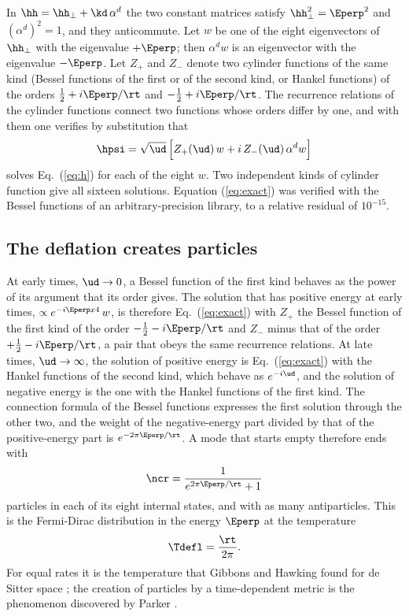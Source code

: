 In $\hh=\hh_\perp+\kd\,\alpha^{d}$ the two constant matrices satisfy $\hh_\perp^{2}=\Eperp^{2}$ and
$(\alpha^{d})^{2}=1$, and they anticommute. Let $w$ be one of the eight eigenvectors of $\hh_\perp$
with the eigenvalue $+\Eperp$; then $\alpha^{d}w$ is an eigenvector with the eigenvalue $-\Eperp$.
Let $Z_+$ and $Z_-$ denote two cylinder functions of the same kind (Bessel functions of the first or
of the second kind, or Hankel functions) of the orders $\tfrac12+i\Eperp/\rt$ and
$-\tfrac12+i\Eperp/\rt$. The recurrence relations of the cylinder functions connect two functions
whose orders differ by one, and with them one verifies by substitution that
\begin{equation}
\hpsi=\sqrt{\ud}\,\Big[Z_+(\ud)\,w+i\,Z_-(\ud)\,\alpha^{d}w\Big]
\label{eq:exact}
\end{equation}
solves Eq.~(\ref{eq:h}) for each of the eight $w$. Two independent kinds of cylinder function give
all sixteen solutions. Equation (\ref{eq:exact}) was verified with the Bessel functions of an
arbitrary-precision library, to a relative residual of $10^{-15}$.

\subsection{The deflation creates particles}

At early times, $\ud\to0$, a Bessel function of the first kind behaves as the power of its argument
that its order gives. The solution that has positive energy at early times,
$\propto e^{-i\Eperp x4}\,w$, is therefore Eq.~(\ref{eq:exact}) with $Z_+$ the Bessel function of the
first kind of the order $-\tfrac12-i\Eperp/\rt$ and $Z_-$ minus that of the order
$+\tfrac12-i\Eperp/\rt$, a pair that obeys the same recurrence relations. At late times, $\ud\to\infty$, the solution of
positive energy is Eq.~(\ref{eq:exact}) with the Hankel functions of the second kind, which behave as
$e^{-i\ud}$, and the solution of negative energy is the one with the Hankel functions of the first
kind. The connection formula of the Bessel functions expresses the first solution through the other
two, and the weight of the negative-energy part divided by that of the positive-energy part is
$e^{-2\pi\Eperp/\rt}$. A mode that starts empty therefore ends with
\begin{equation}
\ncr=\frac{1}{e^{2\pi\Eperp/\rt}+1}
\label{eq:ncr}
\end{equation}
particles in each of its eight internal states, and with as many antiparticles. This is the
Fermi-Dirac distribution in the energy $\Eperp$ at the temperature
\begin{equation}
\Tdefl=\frac{\rt}{2\pi}.
\label{eq:Tdefl}
\end{equation}
For equal rates it is the temperature that Gibbons and Hawking found for de Sitter space
\cite{GibbonsHawking1977}; the creation of particles by a time-dependent metric is the phenomenon
discovered by Parker \cite{Parker1969,BirrellDavies1982}.

